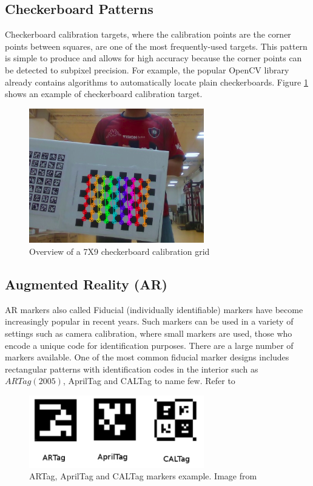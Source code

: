 \subsection{Checkerboard Patterns}

Checkerboard calibration targets, where the calibration points are the corner points between squares, are one of the most frequently-used targets. This pattern is simple to produce and allows for high accuracy because the corner points can be detected to subpixel precision. For example, the popular OpenCV library already contains algorithms to automatically locate plain checkerboards. Figure \ref{fig:target1} shows an example of checkerboard calibration target.


\begin{figure}[!h]
\begin{center}
\includegraphics[width=3in]{figures03/openCV1.png}
\caption{Overview of a 7X9 checkerboard calibration grid }%
\label{fig:target1}
\end{center}
\end{figure}

\subsection{Augmented Reality (AR)}
AR markers also called Fiducial (individually identifiable) markers have become increasingly popular in recent years. Such markers can be used in a variety of settings such as camera calibration, where small markers are used, those who encode a unique code for identification purposes. There are a large number of markers available. One of the most common fiducial marker designs includes rectangular patterns with identification codes in the interior such as $ARTag (2005)$, AprilTag and CALTag to name few.  Refer to \cite{fiducialTargets} 


\begin{figure}[!h]
\begin{center}
\includegraphics[width=3in]{figures03/fiducials.png}
\caption{ARTag, AprilTag and CALTag markers example. Image from \cite{fiducialTargets}}
\label{fig:fiducial}
\end{center}
\end{figure}

